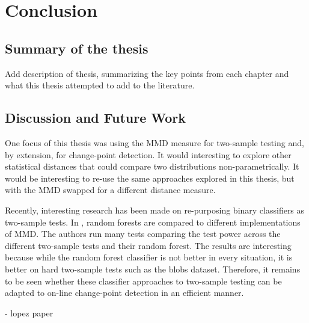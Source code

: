 \chapter{Conclusion}
\section{Summary of the thesis}
Add description of thesis, summarizing the key points from each chapter and what this thesis attempted to add to the literature.

\section{Discussion and Future Work}


One focus of this thesis was using the MMD measure for two-sample testing and, by extension, for change-point detection. It would interesting to explore other statistical distances that could compare two distributions non-parametrically. It would be interesting to re-use the same approaches explored in this thesis, but with the MMD swapped for a different distance measure. 

Recently, interesting research has been made on re-purposing binary classifiers as two-sample tests. In \cite{hediger2019use}, random forests are compared to different implementations of MMD. The authors run many tests comparing the test power across the different two-sample tests and their random forest. The results are interesting because while the random forest classifier is not better in every situation, it is better on hard two-sample tests such as the blobs dataset. Therefore, it remains to be seen whether these classifier approaches to two-sample testing can be adapted to on-line change-point detection in an efficient manner.

- lopez paper

